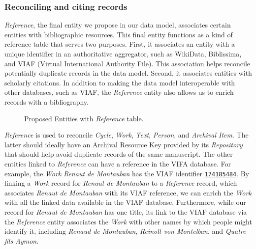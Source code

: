 \subsubsection{Reconciling and citing records}

\textit{Reference}, the final entity we propose in our data model, associates certain entities with bibliographic resources. This final entity functions as a kind of reference table that serves two purposes. First, it associates an entity with a unique identifier in an authoritative aggregator, such as WikiData, Biblissima, and VIAF (Virtual International Authority File). This association helps reconcile potentially duplicate records in the data model. Second, it associates entities with scholarly citations. In addition to making the data model interoperable with other databases, such as VIAF, the \textit{Reference} entity also allows us to enrich records with a bibliography.

\begin{figure}[ht]
    \begin{center}
        
    \end{center}
\caption{Proposed Entities with \textit{Reference} table.}
\label{fig:ProposedEntitiesReference}
\end{figure}

\textit{Reference} is used to reconcile \textit{Cycle}, \textit{Work}, \textit{Text}, \textit{Person}, and \textit{Archival Item}. The latter should ideally have an Archival Resource Key provided by its \textit{Repository} that should help avoid duplicate records of the same manuscript. The other entities linked to \textit{Reference} can have a reference in the VIFA database. For example, the \textit{Work} \textit{Renaut de Montauban} has the VIAF identifier \href{http://viaf.org/viaf/174185484}{\texttt{174185484}}. By linking a \textit{Work} record for \textit{Renaut de Montauban} to a \textit{Reference} record, which associates \textit{Renaut de Montauban} with its VIAF reference, we can enrich the \textit{Work} with all the linked data available in the VIAF database. Furthermore, while our record for \textit{Renaut de Montauban} has one title, its link to the VIAF database via the \textit{Reference} entity associates the \textit{Work} with other names by which people might identify it, including \textit{Renaud de Montauban}, \textit{Reinolt von Montelban}, and \textit{Quatre fils Aymon}.


